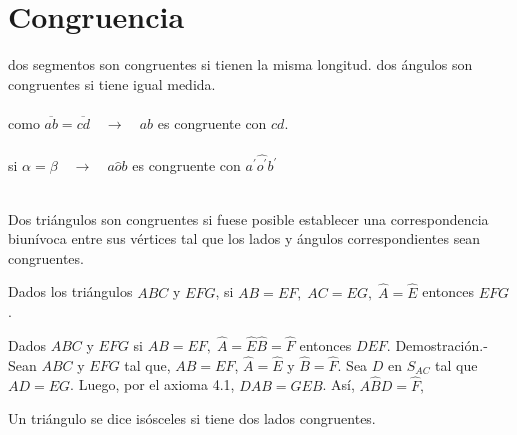 \chapter{Congruencia}

\begin{tcolorbox}[colframe=white]
    \begin{def.}
	dos segmentos son congruentes si tienen la misma longitud. dos ángulos son congruentes si tiene igual medida.\\\\
	como $\overline{ab}=\overline{cd} \quad \rightarrow \quad ab$ es congruente con $cd$.\\\\
	si $\alpha = \beta \quad \rightarrow \quad a\widehat{o}b$ es congruente con $a^{'}\widehat{o^{'}}b^{'}$\\\\
    \end{def.}
\end{tcolorbox}

\begin{tcolorbox}[colframe=white]
    \begin{def.}
	Dos triángulos son congruentes si fuese posible establecer una correspondencia biunívoca entre sus vértices tal que los lados y ángulos correspondientes sean congruentes.
    \end{def.}
\end{tcolorbox}

\begin{tcolorbox}[colframe=white]
    \begin{axioma}
	Dados los triángulos $ABC$ y $EFG$, si $AB=EF, \; AC=EG,\; \widehat{A}=\widehat{E}$ entonces $EFG$. 
    \end{axioma}
\end{tcolorbox}

    \begin{teo} Dados $ABC$ y $EFG$ si $AB=EF, \; \widehat{A}=\widehat{E} \widehat{B}=\widehat{F}$ entonces $DEF$.
	Demostración.-\; Sean $ABC$ y $EFG$ tal que, $AB=EF$, $\widehat{A}=\widehat{E}$ y $\widehat{B}=\widehat{F}$. Sea $D$ en $S_{AC}$ tal que $AD=EG$. Luego, por el axioma 4.1, $DAB=GEB$. Así, $A\widehat{B}D=\widehat{F},$ 
    \end{teo}

\begin{tcolorbox}[colframe=white]
    \begin{def.}
	Un triángulo se dice isósceles si tiene dos lados congruentes.
    \end{def.}
\end{tcolorbox}

